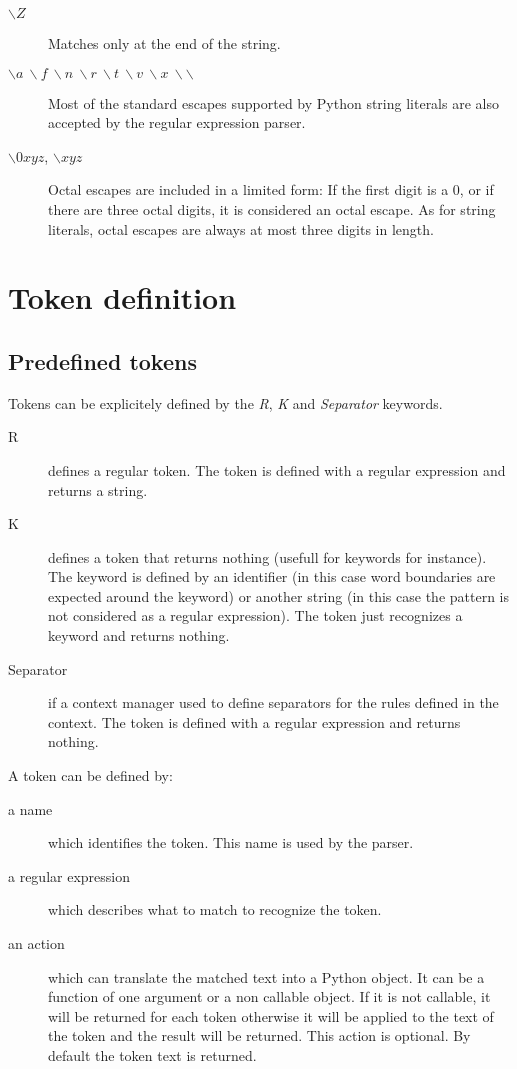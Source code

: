 \begin{description}
    \item [$\backslash Z$]
    Matches only at the end of the string.
    \item [$\backslash a ~ \backslash f ~ \backslash n ~ \backslash r ~ \backslash t ~ \backslash v ~ \backslash x ~ \backslash\backslash$]
    Most of the standard escapes supported by Python string literals are also accepted by the regular expression parser.
    \item [$\backslash 0xyz$, $\backslash xyz$] Octal escapes are included in a limited form: If the first digit is a 0, or if there are three octal digits, it is considered an octal escape. As for string literals, octal escapes are always at most three digits in length. 
\end{description}

\section{Token definition}                                  \label{lexer:token_def}

\subsection{Predefined tokens}

Tokens can be explicitely defined by the \emph{R}, \emph{K} and \emph{Separator} keywords.

\begin{description}
    \item [R] defines a regular token.
        The token is defined with a regular expression and returns a string.
    \item [K] defines a token that returns nothing (usefull for keywords for instance).
        The keyword is defined by an identifier (in this case word boundaries are expected around the keyword)
        or another string (in this case the pattern is not considered as a regular expression).
        The token just recognizes a keyword and returns nothing.
    \item [Separator] if a context manager used to define separators for the rules defined in the context.
        The token is defined with a regular expression and returns nothing.
\end{description}

A token can be defined by:

\begin{description}
    \item [a name] which identifies the token.
        This name is used by the parser.
    \item [a regular expression] which describes what to match to recognize the token.
    \item [an action] which can translate the matched text into a Python object. It can be a function of one argument or a non callable object. If it is not callable, it will be returned for each token otherwise it will be applied to the text of the token and the result will be returned. This action is optional. By default the token text is returned.
\end{description}

